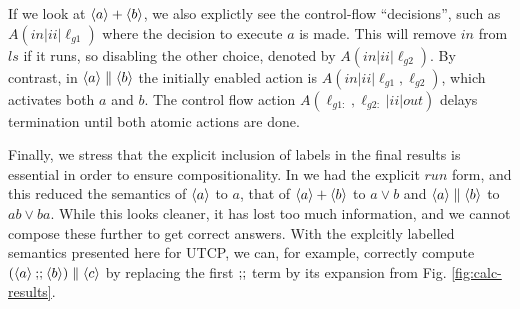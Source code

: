 If we look at $\langle a\rangle + \langle b\rangle$, we also explictly
see the control-flow ``decisions'',
such as $A(in|ii|\ell_{g1})$ where the decision to execute $a$ is made.
This will remove $in$ from $ls$ if it runs,
so disabling the other choice, denoted by $A(in|ii|\ell_{g2})$.
By contrast, in $\langle a\rangle\parallel \langle b\rangle$ the initially enabled
action is $A(in|ii|\ell_{g1},\ell_{g2})$, which activates both $a$ and $b$.
The control flow action $A(\ell_{g1:},\ell_{g2:}|ii|out)$ delays termination
until both atomic actions are done.

Finally,
we stress that the explicit inclusion of labels in the final results
is essential in order to ensure compositionality.
In \cite{conf/tase/BMN16} we had the explicit $run$ form,
and this reduced the semantics of $\langle a\rangle$ to $a$,
that of $\langle a\rangle + \langle b\rangle$ to $a \lor b$
and $\langle a\rangle \parallel \langle b\rangle$ to $ab\lor ba$.
While this looks cleaner, it has lost too much information,
and we cannot compose these further to get correct answers.
With the explcitly labelled semantics presented here for UTCP,
we can, for example, correctly compute $(\langle a\rangle \mathbin{;\!;} \langle b\rangle) \parallel \langle c\rangle$
by replacing the first $\mathbin{;\!;}$ term by its expansion
from Fig. \ref{fig:calc-results}.
